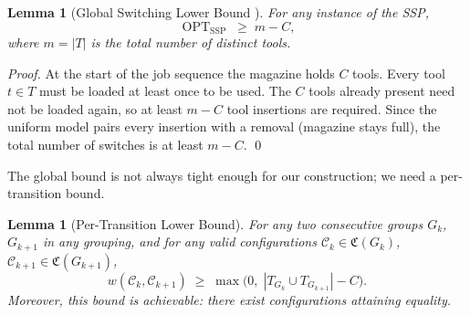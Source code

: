 \documentclass[11pt,a4paper]{article}
\theoremstyle{plain}
\newtheorem{lemma}[theorem]{Lemma}
\theoremstyle{definition}
\DeclareMathOperator{\OPT}{OPT}
\newcommand{\Cconf}{\mathfrak{C}}   %
\newcommand{\sswitch}[2]{w(#1,#2)}  %
\begin{document}
\begin{thmbox}
\begin{lemma}[Global Switching Lower Bound {\normalfont\cite{daSilva2021}}]
\label{lem:globalLB}
For any instance of the SSP,
\[
  \OPT_{\text{SSP}} \;\ge\; m - C,
\]
where $m = |T|$ is the total number of distinct tools.
\end{lemma}
\end{thmbox}

\begin{proof}
At the start of the job sequence the magazine holds $C$ tools.
Every tool $t \in T$ must be loaded at least once to be used.
The $C$ tools already present need not be loaded again, so at least $m-C$ tool
insertions are required. Since the uniform model pairs every insertion with a removal
(magazine stays full), the total number of switches is at least $m-C$. \qed
\end{proof}

The global bound is not always tight enough for our construction; we need a
per-transition bound.

\begin{thmbox}
\begin{lemma}[Per-Transition Lower Bound]
\label{lem:perTransLB}
For any two consecutive groups $G_k$, $G_{k+1}$ in any grouping, and for any valid
configurations $\mathcal{C}_k \in \Cconf(G_k)$, $\mathcal{C}_{k+1} \in \Cconf(G_{k+1})$,
\[
  \sswitch{\mathcal{C}_k}{\mathcal{C}_{k+1}}
  \;\ge\;
  \max\!\bigl(0,\;|T_{G_k} \cup T_{G_{k+1}}| - C\bigr).
\]
Moreover, this bound is \emph{achievable}: there exist configurations attaining equality.
\end{lemma}
\end{thmbox}
\end{document}
